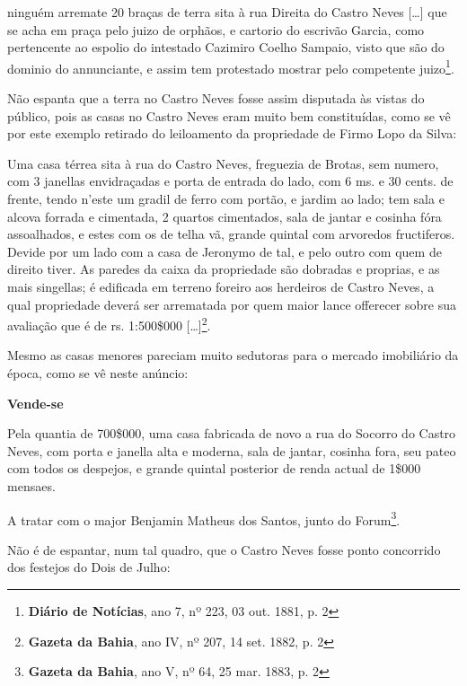 \begin{citacao}
ninguém arremate 20 braças de terra sita à rua Direita do Castro Neves [\dots] que se acha em praça pelo juizo de orphãos, e cartorio do escrivão Garcia, como pertencente ao espolio do intestado Cazimiro Coelho Sampaio, visto que são do dominio do annunciante, e assim tem protestado mostrar pelo competente juizo\footnote{\textbf{Diário de Notícias}, ano 7, nº 223, 03 out. 1881, p. 2}.
\end{citacao}

Não espanta que a terra no Castro Neves fosse assim disputada às vistas do público, pois as casas no Castro Neves eram muito bem constituídas, como se vê por este exemplo retirado do leiloamento da propriedade de Firmo Lopo da Silva:

\begin{citacao}
Uma casa térrea sita à rua do Castro Neves, freguezia de Brotas, sem numero, com 3 janellas envidraçadas e porta de entrada do lado, com 6 ms. e 30 cents. de frente, tendo n'este um gradil de ferro com portão, e jardim ao lado; tem sala e alcova forrada e cimentada, 2 quartos cimentados, sala de jantar e cosinha fóra assoalhados, e estes com os de telha vã, grande quintal com arvoredos fructiferos. Devide por um lado com a casa de Jeronymo de tal, e pelo outro com quem de direito tiver. As paredes da caixa da propriedade são dobradas e proprias, e as mais singellas; é edificada em terreno foreiro aos herdeiros de Castro Neves, a qual propriedade deverá ser arrematada por quem maior lance offerecer sobre sua avaliação que é de rs. 1:500\$000 [\dots]\footnote{\textbf{Gazeta da Bahia}, ano IV, nº 207, 14 set. 1882, p. 2}.
\end{citacao}

Mesmo as casas menores pareciam muito sedutoras para o mercado imobiliário da época, como se vê neste anúncio:

\begin{citacao}
\textbf{Vende-se}

Pela quantia de 700\$000, uma casa fabricada de novo a rua do Socorro do Castro Neves, com porta e janella alta e moderna, sala de jantar, cosinha fora, seu pateo com todos os despejos, e grande quintal posterior de renda actual de 1\$000 mensaes.

A tratar com o major Benjamin Matheus dos Santos, junto do Forum\footnote{\textbf{Gazeta da Bahia}, ano V, nº 64, 25 mar. 1883, p. 2}.
\end{citacao}

Não é de espantar, num tal quadro, que o Castro Neves fosse ponto concorrido dos festejos do Dois de Julho:

